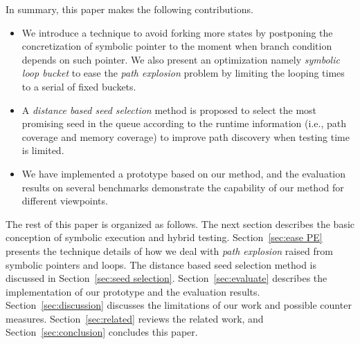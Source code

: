 In summary, this paper makes the following contributions.
\begin{itemize}
\item We introduce a technique to avoid forking more states by postponing the concretization of symbolic pointer to the moment when branch condition depends on such pointer.  
 We also present an optimization namely \emph{symbolic loop bucket} to ease the \textit{path explosion} problem by limiting the looping times to a serial of fixed buckets.

\item A \emph{distance based seed selection} method is proposed to select the most promising seed 
 in the queue according to the runtime information (i.e., path coverage and memory coverage) to improve path discovery when testing time is limited. 

\item We have implemented a prototype based on our method, 
 and the evaluation results on several benchmarks demonstrate the capability of our method for different viewpoints.
\end{itemize}

{\color{blue}{the above is duplication, should be removed.}}

The rest of this paper is organized as follows. 
 The next section describes the basic conception of symbolic execution and hybrid testing. 
 {\color{blue}{give the reference, do not say the next section.}}
 Section~\ref{sec:ease PE} presents the technique details of how we deal with \textit{path explosion} raised from symbolic pointers and loops. The distance based seed selection method is discussed in Section~\ref{sec:seed selection}. Section~\ref{sec:evaluate} describes the implementation of our prototype and the evaluation results. Section~\ref{sec:discussion} discusses the limitations of our work and possible counter measures. Section~\ref{sec:related} reviews the related work, and Section~\ref{sec:conclusion} concludes this paper.
